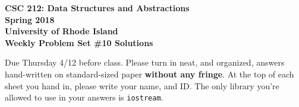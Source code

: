\documentclass[11pt]{article}
\begin{document}
    \thispagestyle{empty}
    
    \begin{center}
        {\Large\bf CSC 212: Data Structures and Abstractions}\\
        \medskip
        {\Large\bf Spring 2018}\\
        \medskip
        {\Large\bf University of Rhode Island}\\
        \bigskip
        {\Large\bf Weekly Problem Set \#10 Solutions}
    \end{center}
    
    Due Thursday 4/12 before class. Please turn in neat, and organized, answers hand-written on standard-sized paper \textbf{without any fringe}. At the top of each sheet you hand in, please write your name, and ID.
    The only library you're allowed to use in your answers is \verb|iostream|.
    
\end{document}
